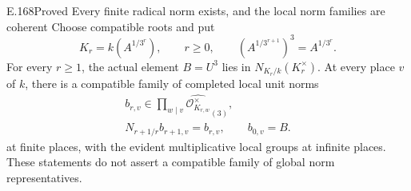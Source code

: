 \begin{result}{E.168}{Proved}
{Every finite radical norm exists, and the local norm families are coherent}
Choose compatible roots and put
\[
 K_r=k(A^{1/3^r}),\qquad r\ge0,
 \qquad (A^{1/3^{r+1}})^3=A^{1/3^r}.
\tag{E.168.1}
\]
For every \(r\ge1\), the actual element \(B=U^3\) lies in
\(N_{K_r/k}(K_r^\times)\).  At every place \(v\) of \(k\),
there is a compatible family of completed local unit norms
\[
\begin{gathered}
 b_{r,v}\in\prod_{w\mid v}\widehat{\mathcal O_{K_{r,w}}^\times}_{(3)},\\
 N_{r+1/r}b_{r+1,v}=b_{r,v},\qquad b_{0,v}=B.
\end{gathered}
\tag{E.168.2}
\]
at finite places, with the evident multiplicative local groups at
infinite places.  These statements do not assert a compatible
family of global norm representatives.
\end{result}

